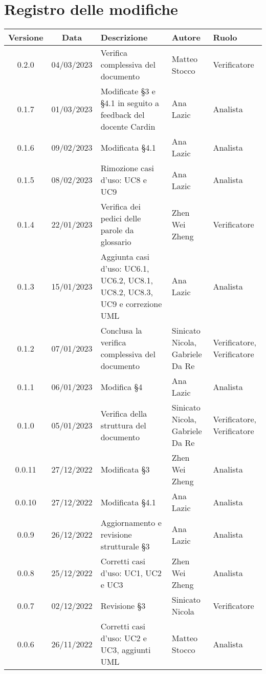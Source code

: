 \section*{Registro delle modifiche}
\begin{center}
\setlength\extrarowheight{5pt}
\renewcommand\tabularxcolumn[1]{>{\Centering}m{#1}}
\begin{tabularx}{\textwidth}{| c | c | X | X | X |} 
	\hline
	\rowcolor{white}
	\textbf{Versione} & \textbf{Data} & \textbf{Descrizione} & \textbf{Autore} & \textbf{Ruolo}\\
	\hline
	0.2.0 & 04/03/2023 & Verifica complessiva del documento & Matteo Stocco & Verificatore \\
 	\hline
	0.1.7 & 01/03/2023 & Modificate §3 e §4.1 in seguito a feedback del docente Cardin & Ana Lazic & Analista \\
	\hline
	0.1.6 & 09/02/2023 & Modificata §4.1 & Ana Lazic & Analista \\
 	\hline
	0.1.5 & 08/02/2023 & Rimozione casi d'uso: UC8 e UC9 & Ana Lazic & Analista \\
	\hline
	0.1.4 & 22/01/2023 & Verifica dei pedici delle parole da glossario & Zhen Wei Zheng & Verificatore \\
    	\hline
   	 0.1.3 & 15/01/2023 & Aggiunta casi d'uso: UC6.1, UC6.2, UC8.1, UC8.2, UC8.3, UC9 e correzione UML & Ana Lazic & Analista \\
	\hline
	0.1.2 & 07/01/2023 & Conclusa la verifica complessiva del documento & Sinicato Nicola, Gabriele Da Re & Verificatore, Verificatore \\
	\hline
	0.1.1 & 06/01/2023 & Modifica §4 & Ana Lazic & Analista \\
	\hline
	0.1.0 & 05/01/2023 & Verifica della struttura del documento & Sinicato Nicola, Gabriele Da Re & Verificatore, Verificatore\\
	\hline
	0.0.11 & 27/12/2022 & Modificata §3 & Zhen Wei Zheng & Analista\\
    	\hline
	0.0.10 & 27/12/2022 & Modificata §4.1 & Ana Lazic & Analista\\
   	\hline
	0.0.9 & 26/12/2022 & Aggiornamento e revisione strutturale §3 & Ana Lazic & Analista\\
	\hline
	0.0.8 & 25/12/2022 & Corretti casi d'uso: UC1, UC2 e UC3 & Zhen Wei Zheng & Analista\\
	\hline
	0.0.7 & 02/12/2022 & Revisione §3 & Sinicato Nicola & Verificatore\\
	\hline
	0.0.6 & 26/11/2022 & Corretti casi d'uso: UC2 e UC3, aggiunti UML & Matteo Stocco & Analista\\

\end{tabularx}
\end{center}
